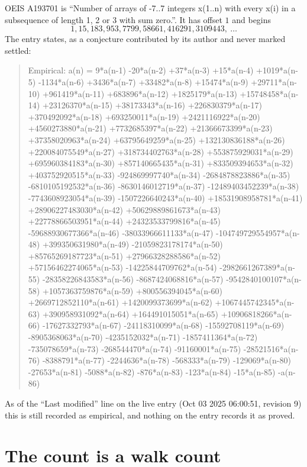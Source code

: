 \documentclass[11pt,a4paper]{article}
\theoremstyle{plain}
\theoremstyle{definition}
\begin{document}
OEIS A193701 is ``Number of arrays of -7..7 integers x(1..n) with every x(i) in a subsequence of length 1, 2 or 3 with sum zero.''. It has offset $1$ and begins
\[
1, 15, 183, 953, 7799, 58661, 416291, 3109443,\ \dots
\]
The entry states, as a conjecture contributed by its author and never marked settled:
\begin{quote}
Empirical: a(n) = 9*a(n-1) -20*a(n-2) +37*a(n-3) +15*a(n-4) +1019*a(n-5) -1134*a(n-6) +3436*a(n-7) +33482*a(n-8) +15474*a(n-9) +29711*a(n-10) +961419*a(n-11) +683896*a(n-12) +1825179*a(n-13) +15748458*a(n-14) +23126370*a(n-15) +38173343*a(n-16) +226830379*a(n-17) +370492092*a(n-18) +693250011*a(n-19) +2421116922*a(n-20) +4560273880*a(n-21) +7732685397*a(n-22) +21366673399*a(n-23) +37358020963*a(n-24) +63795649259*a(n-25) +132130836188*a(n-26) +220084075549*a(n-27) +318734402763*a(n-28) +553875929031*a(n-29) +695960384183*a(n-30) +857140665435*a(n-31) +833509394653*a(n-32) +403752920515*a(n-33) -924869997740*a(n-34) -2684878823886*a(n-35) -6810105192532*a(n-36) -8630146012719*a(n-37) -12489403452239*a(n-38) -7743608923054*a(n-39) -1507226640243*a(n-40) +18531908958781*a(n-41) +28906227483030*a(n-42) +50629889861673*a(n-43) +22778866503951*a(n-44) +24323533799816*a(n-45) -59688930677366*a(n-46) -38033966611133*a(n-47) -104749729554957*a(n-48) +399350631980*a(n-49) -21059823178174*a(n-50) +85765269187723*a(n-51) +27966328288586*a(n-52) +57156462274065*a(n-53) -14225844709762*a(n-54) -2982661267389*a(n-55) -28358226843583*a(n-56) -8687424068816*a(n-57) -9542840100107*a(n-58) +1057363759876*a(n-59) +800556394045*a(n-60) +2669712852110*a(n-61) +1420099373699*a(n-62) +1067445742345*a(n-63) +390958931092*a(n-64) +164491015051*a(n-65) +10906818266*a(n-66) -17627332793*a(n-67) -24118310099*a(n-68) -15592708119*a(n-69) -8905368063*a(n-70) -4235152032*a(n-71) -1857411364*a(n-72) -735078659*a(n-73) -268544470*a(n-74) -91160001*a(n-75) -28521516*a(n-76) -8388791*a(n-77) -2244636*a(n-78) -568333*a(n-79) -129069*a(n-80) -27653*a(n-81) -5088*a(n-82) -876*a(n-83) -123*a(n-84) -15*a(n-85) -a(n-86)
\end{quote}
As of the ``Last modified'' line on the live entry (Oct 03 2025 06:00:51, revision 9) this is still
recorded as empirical, and nothing on the entry records it as proved.

\section{The count is a walk count}
\end{document}
